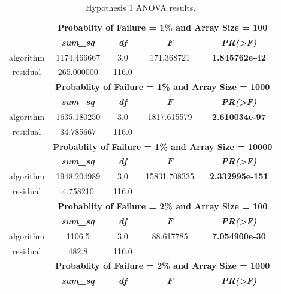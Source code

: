 \begin{table}[H]
    \caption{Hypothesis 1 ANOVA results.}
    \begin{center}
    \begin{tabular}{|c|c|c|c|c|}
    \hline
    \multirow{2}{*}{\hfill}&\multicolumn{4}{|c|}{\textbf{Probablity of Failure = 1\% and Array Size = 100}} \\
    \cline{2-5}
    &\textbf{\textit{sum\_sq}} & \textbf{\textit{df}} & \textbf{\textit{F}} & \textbf{\textit{PR(>F)}} \\
    \hline
    algorithm & 1174.466667 & 3.0 & 171.368721 & \textbf{1.845762e-42} \\
    \hline
    residual & 265.000000 & 116.0 & & \\
    \hline
    \multirow{2}{*}{\hfill}&\multicolumn{4}{|c|}{\textbf{Probablity of Failure = 1\% and Array Size = 1000}} \\
    \cline{2-5}
    &\textbf{\textit{sum\_sq}} & \textbf{\textit{df}} & \textbf{\textit{F}} & \textbf{\textit{PR(>F)}} \\
    \hline
    algorithm & 1635.180250 & 3.0 & 1817.615579 & \textbf{2.610034e-97} \\
    \hline
    residual & 34.785667 & 116.0 & & \\
    \hline
    \multirow{2}{*}{\hfill}&\multicolumn{4}{|c|}{\textbf{Probablity of Failure = 1\% and Array Size = 10000}} \\
    \cline{2-5}
    &\textbf{\textit{sum\_sq}} & \textbf{\textit{df}} & \textbf{\textit{F}} & \textbf{\textit{PR(>F)}} \\
    \hline
    algorithm & 1948.204989 & 3.0 & 15831.708335 & \textbf{2.332995e-151} \\
    \hline
    residual & 4.758210 & 116.0 & & \\
    \hline
    \multirow{2}{*}{\hfill}&\multicolumn{4}{|c|}{\textbf{Probablity of Failure = 2\% and Array Size = 100}} \\
    \cline{2-5}
    &\textbf{\textit{sum\_sq}} & \textbf{\textit{df}} & \textbf{\textit{F}} & \textbf{\textit{PR(>F)}} \\
    \hline
    algorithm & 1106.5 & 3.0 & 88.617785 & \textbf{7.054900e-30} \\
    \hline
    residual & 482.8 & 116.0 & & \\
    \hline
    \multirow{2}{*}{\hfill}&\multicolumn{4}{|c|}{\textbf{Probablity of Failure = 2\% and Array Size = 1000}} \\
    \cline{2-5}
    &\textbf{\textit{sum\_sq}} & \textbf{\textit{df}} & \textbf{\textit{F}} & \textbf{\textit{PR(>F)}} \\

\end{tabular}
\end{center}
\end{table}
